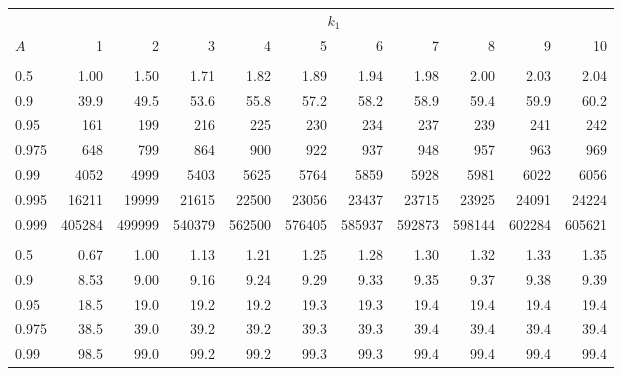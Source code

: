 \documentclass[]{article}
\begin{document}
\begin{table}[H]
\centering
\begin{tabular}{lrrrrrrrrrr}
\toprule
\multicolumn{1}{c}{ } & \multicolumn{10}{c}{$k_1$} \\
\cmidrule(l{3pt}r{3pt}){2-11}
\hspace{1.1em}$A$ & 1 & 2 & 3 & 4 & 5 & 6 & 7 & 8 & 9 & 10\\
\midrule
\addlinespace[0.3em]
\multicolumn{11}{l}{\textbf{$k_2=1$}}\\
\hspace{1em}0.5 & 1.00 & 1.50 & 1.71 & 1.82 & 1.89 & 1.94 & 1.98 & 2.00 & 2.03 & 2.04\\
\hspace{1em}0.9 & 39.9 & 49.5 & 53.6 & 55.8 & 57.2 & 58.2 & 58.9 & 59.4 & 59.9 & 60.2\\
\hspace{1em}0.95 & 161 & 199 & 216 & 225 & 230 & 234 & 237 & 239 & 241 & 242\\
\hspace{1em}0.975 & 648 & 799 & 864 & 900 & 922 & 937 & 948 & 957 & 963 & 969\\
\hspace{1em}0.99 & 4052 & 4999 & 5403 & 5625 & 5764 & 5859 & 5928 & 5981 & 6022 & 6056\\
\hspace{1em}0.995 & 16211 & 19999 & 21615 & 22500 & 23056 & 23437 & 23715 & 23925 & 24091 & 24224\\
\hspace{1em}0.999 & 405284 & 499999 & 540379 & 562500 & 576405 & 585937 & 592873 & 598144 & 602284 & 605621\\
\addlinespace[0.3em]
\multicolumn{11}{l}{\textbf{$k_2=2$}}\\
\hspace{1em}0.5 & 0.67 & 1.00 & 1.13 & 1.21 & 1.25 & 1.28 & 1.30 & 1.32 & 1.33 & 1.35\\
\hspace{1em}0.9 & 8.53 & 9.00 & 9.16 & 9.24 & 9.29 & 9.33 & 9.35 & 9.37 & 9.38 & 9.39\\
\hspace{1em}0.95 & 18.5 & 19.0 & 19.2 & 19.2 & 19.3 & 19.3 & 19.4 & 19.4 & 19.4 & 19.4\\
\hspace{1em}0.975 & 38.5 & 39.0 & 39.2 & 39.2 & 39.3 & 39.3 & 39.4 & 39.4 & 39.4 & 39.4\\
\hspace{1em}0.99 & 98.5 & 99.0 & 99.2 & 99.2 & 99.3 & 99.3 & 99.4 & 99.4 & 99.4 & 99.4\\

\end{tabular}
\end{table}
\end{document}
